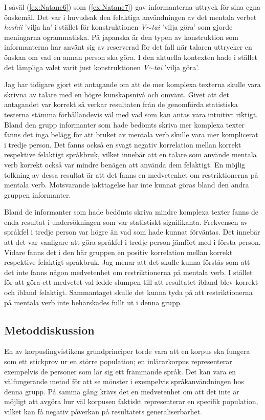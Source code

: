 \documentclass[12pt,a4paper]{article}
\begin{document}
\noindent
I såväl (\ref{ex:Natane6}) som (\ref{ex:Natane7}) gav informanterna uttryck för sina egna önskemål. Det var i huvudsak den felaktiga användningen av det mentala verbet \emph{hoshii} 'vilja ha' i stället för konstruktionen \emph{V$\sim$tai} 'vilja göra' som gjorde meningarna ogrammatiska. På japanska är den typen av konstruktion som informanterna har använt sig av reserverad för det fall när talaren uttrycker en önskan om vad en annan person ska göra. I den aktuella kontexten hade i stället det lämpliga valet varit just konstruktionen \emph{V$\sim$tai} 'vilja göra'.

Jag har tidigare gjort ett antagande om att de mer komplexa texterna skulle vara skrivna av talare med en högre kunskapsnivå och omvänt. Givet att det antagandet var korrekt så verkar resultaten från de genomförda statistiska testerna stämma förhållandevis väl med vad som kan antas vara intuitivt riktigt. Bland den grupp informanter som hade bedömts skriva mer komplexa texter fanns det inga belägg för att bruket av mentala verb skulle vara mer komplicerat i tredje person. Det fanns också en svagt negativ korrelation mellan korrekt respektive felaktigt språkbruk, vilket innebär att en talare som använde mentala verb korrekt också var mindre benägen att använda dem felaktigt. En möjlig tolkning av dessa resultat är att det fanns en medvetenhet om restriktionerna på mentala verb. Motsvarande iakttagelse har inte kunnat göras bland den andra gruppen informanter.

Bland de informanter som hade bedömts skriva mindre komplexa texter fanns de enda resultat i undersökningen som var statistiskt signifikanta. Frekvensen av språkfel i tredje person var högre än vad som hade kunnat förväntas. Det innebär att det var vanligare att göra språkfel i tredje person jämfört med i första person. Vidare fanns det i den här gruppen en positiv korrelation mellan korrekt respektive felaktigt språkbruk. Jag menar att det skulle kunna förstås som att det inte fanns någon medvetenhet om restriktionerna på mentala verb. I stället för att göra ett medvetet val ledde slumpen till att resultatet ibland blev korrekt och ibland felaktigt. Sammantaget skulle det kunna tyda på att restriktionerna på mentala verb inte behärskades fullt ut i denna grupp.

\subsection{Metoddiskussion}
\label{sec:Diskussion: Metoddiskussion}
En av korpuslingvistikens grundprinciper torde vara att en korpus ska fungera som ett stickprov ur en större population; en inlärarkorpus representerar exempelvis de personer som lär sig ett främmande språk. Det kan vara en välfungerande metod för att se mönster i exempelvis språkanvändningen hos denna grupp. På samma gång krävs det en medvetenhet om att det inte är möjligt att avgöra hur väl korpusen faktiskt representerar en specifik population, vilket kan få negativ påverkan på resultatets generaliserbarhet.
\end{document}
